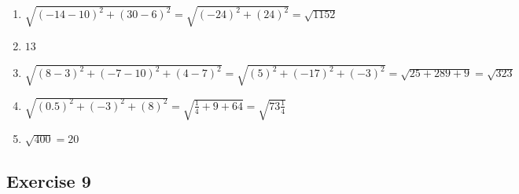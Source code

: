 \documentclass[11pt]{article}
\begin{document}
\begin{enumerate}
	\item %
$
\sqrt{(-14-10)^2+(30-6)^2}=
\sqrt{(-24)^2+(24)^2}=
\sqrt{1152}
$
	\item %
$
13
$
	\item %
$
\sqrt{(8-3)^2+(-7-10)^2+(4-7)^2}=
\sqrt{(5)^2+(-17)^2+(-3)^2}=
\sqrt{25+289+9}=\sqrt{323}
$
	\item %
$
\sqrt{(0.5)^2+(-3)^2+(8)^2}=
\sqrt{\frac{1}{4}+9+64}=
\sqrt{73\frac{1}{4}}
$
	\item %
$
\sqrt{400}=20
$
\end{enumerate}

\subsection{Exercise 9}
\end{document}

